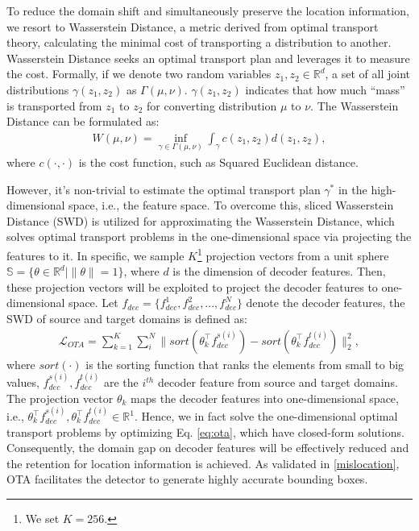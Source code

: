 \documentclass[sigconf]{acmart}
\begin{document}
To reduce the domain shift and simultaneously preserve the location information, we resort to Wasserstein Distance, a metric derived from optimal transport theory, calculating the minimal cost of transporting a distribution to another. Wasserstein Distance seeks an optimal transport plan and leverages it to measure the cost. Formally, if we denote two random variables $z_1, z_2 \in \mathbb{R}^d$, a set of all joint distributions $\gamma (z_1,z_2)$ as $\varGamma (\mu,\nu )$. $\gamma (z_1,z_2)$ indicates that how much ``mass'' is transported from $z_1$ to $z_2$ for converting distribution $\mu$ to $\nu$. The Wasserstein Distance can be formulated as:
\begin{align}
    W(\mu,\nu) = \mathop{\inf}_{\gamma \in \varGamma(\mu,\nu)} \int_{\gamma} c(z_1, z_2)d(z_1,z_2),
\end{align}where $c(\cdot,\cdot)$ is the cost function, such as Squared Euclidean distance. 

However, it's non-trivial to estimate the optimal transport plan $\gamma^{*}$ in the high-dimensional space, i.e., the feature space. To overcome this, sliced Wasserstein Distance (SWD) is utilized \cite{Wasserstein} for approximating the Wasserstein Distance, which solves optimal transport problems in the one-dimensional space via projecting the features to it. In specific, we sample $K$\footnote{We set $K=256$.} projection vectors from a unit sphere $\mathbb{S}=\{\theta \in \mathbb{R}^d| \| \theta\|=1 \}$, where $d$ is the dimension of decoder features. Then, these projection vectors will be exploited to project the decoder features to one-dimensional space. Let $f_{dec}=\{f_{dec}^1, f_{dec}^2, ..., f_{dec}^N\}$ denote the decoder features, the SWD of source and target domains is defined as:
\begin{align}
    \mathcal{L}_{OTA} = \mathop{\sum}_{k=1}^{K} \mathop{\sum}_{i}^{N} \| sort(\theta^{\top}_k f_{dec}^{s(i)}) - sort(\theta^{\top}_k f_{dec}^{t(i)})   \|_2^2,
    \label{eq:ota}
\end{align}where $sort(\cdot)$ is  the sorting function that ranks the elements from small to big values, $f_{dec}^{s(i)}, f_{dec}^{t(i)}$ are the $i^{th}$ decoder feature from source and target domains. The projection vector $\theta_k$ maps the decoder features into one-dimensional space, i.e., $\theta^{\top}_k f_{dec}^{s(i)}, \theta^{\top}_k f_{dec}^{t(i)} \in \mathbb{R}^1$. Hence, we in fact solve the one-dimensional optimal transport problems by optimizing Eq. \eqref{eq:ota}, which have closed-form solutions. Consequently, the domain gap on decoder features will be effectively reduced and the retention for location information is achieved. As validated in \ref{mislocation}, OTA facilitates the detector to generate highly accurate bounding boxes.
\end{document}
